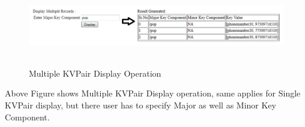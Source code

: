 \begin{figure}[h]
\centering
  \includegraphics[width=13cm,height=3.5cm]{ERD3.png}
  \caption{Multiple KVPair Display Operation}\label{Multiple KVPair Display Operation.}
\end{figure}
Above Figure shows Multiple KVPair Display operation, same applies for Single KVPair display, but there user has to specify Major as well as Minor Key Component.

